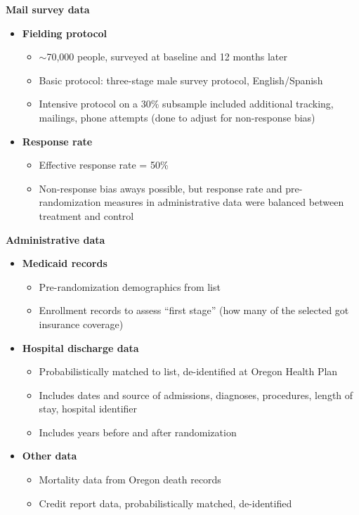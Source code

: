 \documentclass[notes=show]{beamer}
\begin{document}
\begin{frame}[plain]
	\begin{center}
	\textbf{Mail survey data}
	\end{center}
	
	\begin{itemize}
	\item \textbf{Fielding protocol}
		\begin{itemize}
		\item $\sim$70,000 people, surveyed at baseline and 12 months later
		\item Basic protocol: three-stage male survey protocol, English/Spanish
		\item Intensive protocol on a 30\% subsample included additional tracking, mailings, phone attempts (done to adjust for non-response bias)
		\end{itemize}
	\item \textbf{Response rate}
		\begin{itemize}
		\item Effective response rate = 50\%
		\item Non-response bias aways possible, but response rate and pre-randomization measures in administrative data were balanced between treatment and control
		\end{itemize}
	\end{itemize}
\end{frame}

\begin{frame}[plain]
	\begin{center}
	\textbf{Administrative data}
	\end{center}
	
	\begin{itemize}
	\item \textbf{Medicaid records}
		\begin{itemize}
		\item Pre-randomization demographics from list
		\item Enrollment records to assess ``first stage'' (how many of the selected got insurance coverage)
		\end{itemize}
	\item \textbf{Hospital discharge data}
		\begin{itemize}
		\item Probabilistically matched to list, de-identified at Oregon Health Plan 
		\item Includes dates and source of admissions, diagnoses, procedures, length of stay, hospital identifier
		\item Includes years before and after randomization
		\end{itemize}
	\item \textbf{Other data}
		\begin{itemize}
		\item Mortality data from Oregon death records
		\item Credit report data, probabilistically matched, de-identified
		\end{itemize}
	\end{itemize}
\end{frame}
\end{document}

